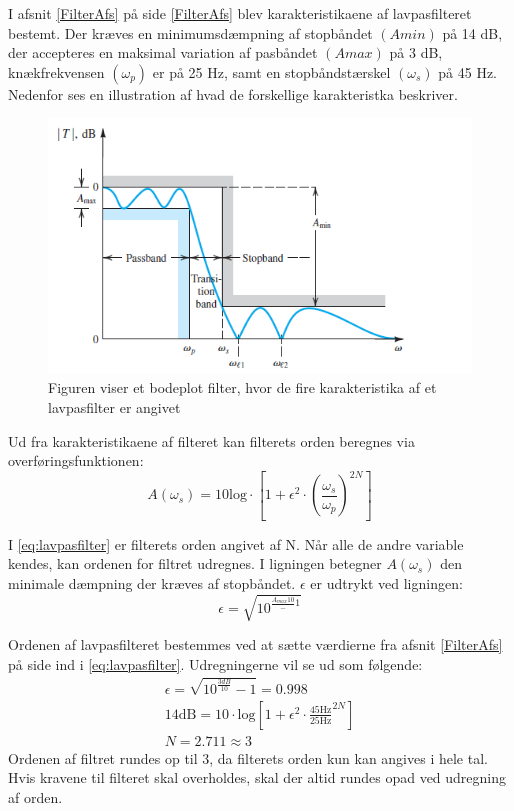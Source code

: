 I afsnit \ref{FilterAfs} på side \ref{FilterAfs} blev karakteristikaene af lavpasfilteret bestemt. Der kræves en minimumsdæmpning af stopbåndet $(Amin)$ på 14 dB, der accepteres en maksimal variation af pasbåndet $(Amax)$ på 3 dB, knækfrekvensen $(\omega _p)$ er på 25 Hz, samt en stopbåndstærskel $(\omega _s)$ på 45 Hz. Nedenfor ses en illustration af hvad de forskellige karakteristka beskriver.

\begin{figure}[H]
	\centering
	\includegraphics[scale=0.8]{figures/cProblemloesning/Lavpasfilter_generisk.PNG}
	\caption{Figuren viser et bodeplot filter, hvor de fire karakteristika af et lavpasfilter er angivet}
	\label{fig:Lavpasfilter_generisk}
\end{figure}

\noindent Ud fra karakteristikaene af filteret kan filterets orden beregnes via overføringsfunktionen:
\begin{equation} \label{eq:lavpasfilter}
A(\omega_s) = 10 \text{log} \cdot \left[1 + \epsilon^2 \cdot (\frac{\omega _s}{\omega _p})^{2N}\right] 
\end{equation}

\noindent I \eqref{eq:lavpasfilter} er filterets orden angivet af N. Når alle de andre variable kendes, kan ordenen for filtret udregnes. I ligningen betegner $A(\omega _s)$ den minimale dæmpning der kræves af stopbåndet. $\epsilon$ er udtrykt ved ligningen:
\begin{equation}
\epsilon = \sqrt{10^{\frac{A_{max}{10}} - 1}}
\end{equation}

Ordenen af lavpasfilteret bestemmes ved at sætte værdierne fra afsnit \ref{FilterAfs} på side \pageref{FilterAfs} ind i \eqref{eq:lavpasfilter}. Udregningerne vil se ud som følgende:
\begin{align}
\epsilon = \sqrt{10^{\frac{3dB}{10}} - 1} = 0.998 \\
14\text{dB} = 10 \cdot \text{log} \left[1 + \epsilon ^2 \cdot \frac{45\text{Hz}}{25\text{Hz}}^{2N}\right] \\
N = 2.711 \approx 3
\end{align}
\noindent Ordenen af filtret rundes op til 3, da filterets orden kun kan angives i hele tal. Hvis kravene til filteret skal overholdes, skal der altid rundes opad ved udregning af orden.

